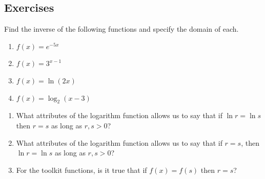 \documentclass[10pt,]{book}
\theoremstyle{ptxdefinitionnotitle}
\theoremstyle{ptxdefinitiontitle}
\theoremstyle{ptxdefinitionnotitle}
\theoremstyle{ptxdefinitiontitle}
\theoremstyle{ptxdefinitionnotitle}
\theoremstyle{ptxdefinitiontitle}
\numberwithin{equation}{section}
\begin{document}
\subsection*{Exercises}\hypertarget{exercises-14}{}
\begin{divisionexercise}{1}\hypertarget{exercise-91}{}
\hypertarget{p-356}{}%
Find the inverse of the following functions and specify the domain of each. \leavevmode%
\begin{enumerate}[label=(\alph*)]
\item\hypertarget{li-243}{}\(f(x) = e^{-5x}\)%
\item\hypertarget{li-244}{}\(f(x) = 3^{x-1}\)%
\item\hypertarget{li-245}{}\(f(x) = \ln \left( 2x \right)\)%
\item\hypertarget{li-246}{}\(f(x) = \log_2 \left( x - 3 \right)\)%
\end{enumerate}
%
\end{divisionexercise}%
\begin{divisionexercise}{2}\hypertarget{exercise-92}{}
\hypertarget{p-357}{}%
\leavevmode%
\begin{enumerate}[label=(\alph*)]
\item\hypertarget{li-247}{}What attributes of the logarithm function allows us to say that if \(\ln r = \ln s\) then \(r = s\) as long as \(r,s > 0\)?%
\item\hypertarget{li-248}{}What attributes of the logarithm function allows us to say that if \(r = s\), then \(\ln r = \ln s\) as long as \(r,s > 0\)?%
\item\hypertarget{li-249}{}For the toolkit functions, is it true that if \(f(x) = f(s)\) then \(r = s\)?%
\end{enumerate}
%
\end{divisionexercise}%
\end{document}
